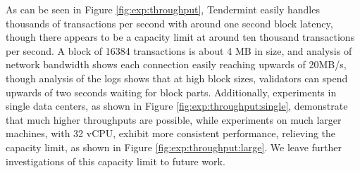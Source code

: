 As can be seen in Figure \ref{fig:exp:throughput},
Tendermint easily handles thousands of transactions per second with around one second block latency,
though there appears to be a capacity limit at around ten thousand transactions per second.
A block of 16384 transactions is about 4 MB in size, and analysis of network bandwidth shows each connection
easily reaching upwards of 20MB/s, though analysis of the logs shows that at high block sizes, 
validators can spend upwards of two seconds waiting for block parts.
Additionally, experiments in single data centers, as shown in Figure \ref{fig:exp:throughput:single},
demonstrate that much higher throughputs are possible,
while experiments on much larger machines, with 32 vCPU, exhibit more consistent performance,
relieving the capacity limit, as shown in Figure \ref{fig:exp:throughput:large}.
We leave further investigations of this capacity limit to future work.

